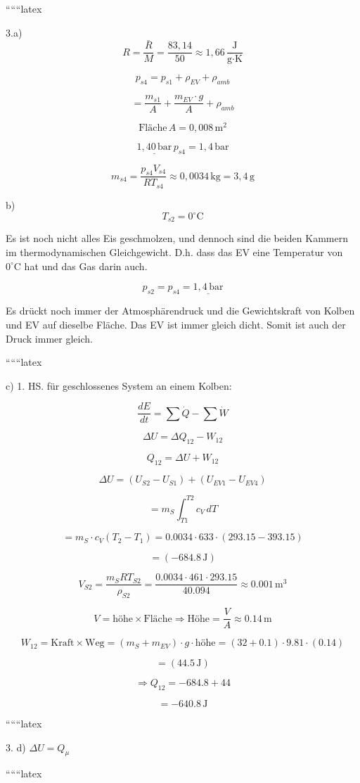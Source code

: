 
``````latex


3.a) 
\[
R = \frac{\bar{R}}{M} = \frac{83,14}{50} \approx 1,66 \, \frac{\text{J}}{\text{g} \cdot \text{K}}
\]

\[
p_{s4} = p_{s1} + \rho_{EV} + \rho_{amb}
\]

\[
= \frac{m_{s1}}{A} + \frac{m_{EV} \cdot g}{A} + \rho_{amb}
\]

\[
\text{Fläche} \, A = 0,008 \, \text{m}^2
\]

\[
\underline{1,40 \, \text{bar}} \, p_{s4} = 1,4 \, \text{bar}
\]

\[
m_{s4} = \frac{p_{s4} V_{s4}}{R T_{s4}} \approx 0,0034 \, \text{kg} = 3,4 \, \text{g}
\]

b) 
\[
T_{s2} = 0^\circ \text{C}
\]

Es ist noch nicht alles Eis geschmolzen, und dennoch sind die beiden Kammern im thermodynamischen Gleichgewicht. D.h. dass das EV eine Temperatur von $0^\circ \text{C}$ hat und das Gas darin auch.

\[
p_{s2} = p_{s4} = \underline{1,4 \, \text{bar}}
\]

Es drückt noch immer der Atmosphärendruck und die Gewichtskraft von Kolben und EV auf dieselbe Fläche. Das EV ist immer gleich dicht. Somit ist auch der Druck immer gleich.

``````latex


c) 1. HS. für geschlossenes System an einem Kolben:

\[
\frac{dE}{dt} = \sum \dot{Q} - \sum \dot{W}
\]

\[
\Delta U = \Delta Q_{12} - W_{12}
\]

\[
Q_{12} = \Delta U + W_{12}
\]

\[
\Delta U = (U_{S2} - U_{S1}) + (U_{EV1} - U_{EV4})
\]

\[
= m_S \int_{T1}^{T2} c_V \, dT
\]

\[
= m_S \cdot c_V (T_2 - T_1) = 0.0034 \cdot 633 \cdot (293.15 - 393.15)
\]

\[
= (-684.8 \, \text{J})
\]

\[
V_{S2} = \frac{m_S R T_{S2}}{\rho_{S2}} = \frac{0.0034 \cdot 461 \cdot 293.15}{40.094} \approx 0.001 \, \text{m}^3
\]

\[
V = \text{höhe} \times \text{Fläche} \Rightarrow \text{Höhe} = \frac{V}{A} \approx 0.14 \, \text{m}
\]

\[
W_{12} = \text{Kraft} \times \text{Weg} = (m_S + m_{EV}) \cdot g \cdot \text{höhe} = (32 + 0.1) \cdot 9.81 \cdot (0.14)
\]

\[
= (44.5 \, \text{J})
\]

\[
\Rightarrow Q_{12} = -684.8 + 44
\]

\[
= -640.8 \, \text{J}
\]

``````latex


3. d) \(\Delta U = Q_\mu\)

``````latex


